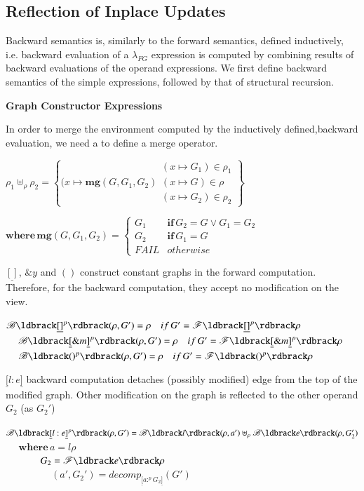 \documentclass{llncs}
\newcommand{\Emp}{\underline{[]}}
\newcommand{\Lef}{\underline{[}}
\newcommand{\Rig}{\underline{]}}
\begin{document}
\subsection{Reflection of Inplace Updates}\label{subsec:bak-inp}

Backward semantics is, similarly to the forward semantics, defined inductively, i.e. backward evaluation of a $\lambda_{FG}$ expression is computed by combining results of backward evaluations of the operand expressions. We first define backward semantics of the simple expressions, followed by that of structural recursion.

\textbf{Graph Constructor Expressions} 

In order to merge the environment computed by the inductively defined,backward evaluation, we need a to define a merge operator.

$\rho_1 \uplus_{\rho}\rho_2=\left\{(x\mapsto\mathbf{mg}(G,G_1,G_2)
    \begin{array}{|l}
     (x\mapsto G_1)\in\rho_1\\
     (x\mapsto G)\in\rho\\
     (x\mapsto G_2)\in\rho_2
    \end{array}
    \right\}$

$\mathbf{where}\,\mathbf{mg}(G,G_1,G_2)=\left\{
\begin{array}{ll}
    G_1 & \mathbf{if}\,G_2=G\vee G_1=G_2\\
    G_2 & \mathbf{if}\,G_1=G\\
    FAIL & otherwise
\end{array}\right.$

$\Emp$, $\&y$ and $()$ construct constant graphs in the forward computation. Therefore, for the backward computation, they accept no modification on the view.

$\mathscr{B}\ldbrack \Emp^p\rdbrack(\rho,G')=\rho\quad if\,G'=\mathscr{F}\ldbrack \Emp^p\rdbrack\rho$\\
$\mbox{~~~~~}\mathscr{B}\ldbrack \Lef\&m\Rig^p\rdbrack(\rho,G')=\rho\quad if\,G'=\mathscr{F}\ldbrack \Lef\&m\Rig^p\rdbrack\rho$\\
$\mbox{~~~~~}\mathscr{B}\ldbrack ()^p\rdbrack(\rho,G')=\rho\quad if\,G'=\mathscr{F}\ldbrack ()^p\rdbrack\rho$

$\Lef l:e\Rig$ backward computation detaches (possibly modified) edge from the top of the modified graph. Other modification on the graph is reflected to the other operand $G_2$ (as $G_2'$)

$\mathscr{B}\ldbrack \Lef l:e\Rig^p\rdbrack(\rho,G')=\mathscr{B}\ldbrack l\rdbrack(\rho,a')\uplus_{\rho}\mathscr{B}\ldbrack e\rdbrack(\rho,G_2')$\\
$\mbox{~~~~}\mathbf{where}\,a=l\rho$\\
$\mbox{~~~~~~~~~~~~~~}G_2=\mathscr{F}\ldbrack e\rdbrack\rho$\\
$\mbox{~~~~~~~~~~~~~~}(a',G_2')=decomp_{\Lef a:^p G_2\Rig}(G')$
\end{document}
